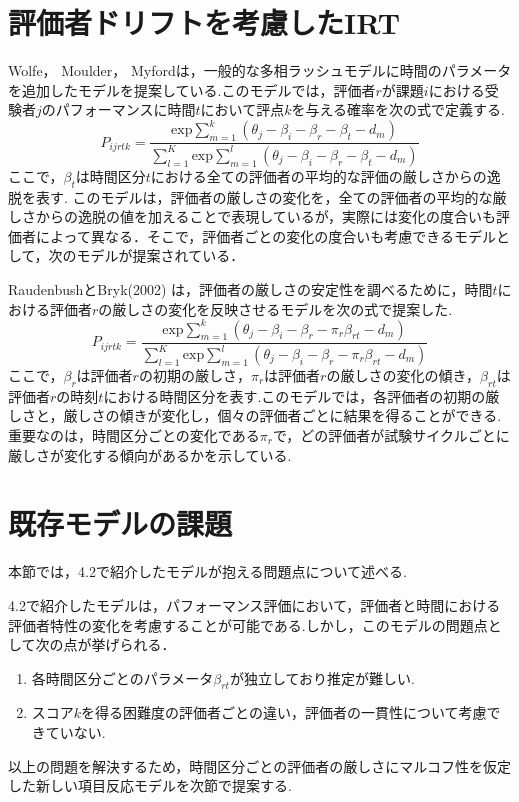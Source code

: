 \documentclass[a4paper,11pt,oneside,openany]{jsbook}
\begin{document}
\section{評価者ドリフトを考慮したIRT}

Wolfe， Moulder， Myfordは，一般的な多相ラッシュモデルに時間のパラメータを追加したモデルを提案している\cite{Wolfe}.このモデルでは，評価者$r$が課題$i$における受験者$j$のパフォーマンスに時間$t$において評点$k$を与える確率を次の式で定義する.
\begin{displaymath}
P_{ijrtk}=\frac{\mathrm{exp}\sum_{m=1}^{k}(\theta_{j}-\beta_{i}-\beta_{r}-\beta_{t}-d_{m})}{\sum_{l=1}^{K}\mathrm{exp}\sum_{m=1}^{l}(\theta_{j}-\beta_{i}-\beta_{r}-\beta_{t}-d_{m})}
\end{displaymath}
ここで，$\beta_t$は時間区分$t$における全ての評価者の平均的な評価の厳しさからの逸脱を表す.
このモデルは，評価者の厳しさの変化を，全ての評価者の平均的な厳しさからの逸脱の値を加えることで表現しているが，実際には変化の度合いも評価者によって異なる．そこで，評価者ごとの変化の度合いも考慮できるモデルとして，次のモデルが提案されている．

RaudenbushとBryk(2002) は，評価者の厳しさの安定性を調べるために，時間$t$における評価者$r$の厳しさの変化を反映させるモデルを次の式で提案した\cite{Raudenbush}.
\begin{displaymath}
P_{ijrtk}=\frac{\mathrm{exp}\sum_{m=1}^{k}(\theta_{j}-\beta_{i}-\beta_{r} - \pi_{r}\beta_{rt}-d_{m})}{\sum_{l=1}^{K}\mathrm{exp}\sum_{m=1}^{l}(\theta_{j}-\beta_{i}-\beta_{r} - \pi_{r}\beta_{rt}-d_{m})}
\end{displaymath}
ここで，$\beta_{r}$は評価者$r$の初期の厳しさ，$\pi_{r}$は評価者$r$の厳しさの変化の傾き，$\beta_{rt}$は評価者$r$の時刻$t$における時間区分を表す.このモデルでは，各評価者の初期の厳しさと，厳しさの傾きが変化し，個々の評価者ごとに結果を得ることができる.重要なのは，時間区分ごとの変化である$\pi_{r}$で，どの評価者が試験サイクルごとに厳しさが変化する傾向があるかを示している.

\section{既存モデルの課題}
本節では，4.2で紹介したモデルが抱える問題点について述べる.

4.2で紹介したモデルは，パフォーマンス評価において，評価者と時間における評価者特性の変化を考慮することが可能である.しかし，このモデルの問題点として次の点が挙げられる．
\begin{enumerate}
  \item 各時間区分ごとのパラメータ$\beta_{rt}$が独立しており推定が難しい.
  \item スコア$k$を得る困難度の評価者ごとの違い，評価者の一貫性について考慮できていない.
\end{enumerate}
以上の問題を解決するため，時間区分ごとの評価者の厳しさにマルコフ性を仮定した新しい項目反応モデルを次節で提案する.
\newpage
\end{document}
